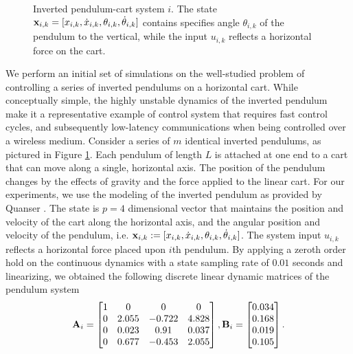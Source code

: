 \begin{figure}

\caption{Inverted pendulum-cart system $i$. The state ${\mathbf x}_{i,k} = [x_{i,k}, \dot{x}_{i,k}, \theta_{i,k}, \dot{\theta}_{i,k}]$ contains specifies angle $ \theta_{i,k}$ of the pendulum to the vertical, while the input $u_{i,k}$ reflects a horizontal force on the cart.}
\label{fig_inverted_pendulum}
\end{figure}


We perform an initial set of simulations on the well-studied problem of controlling a series of inverted pendulums on a horizontal cart. While conceptually simple, the highly unstable dynamics of the inverted pendulum make it a representative example of control system that requires fast control cycles, and subsequently low-latency communications when being controlled over a wireless medium. Consider a series of $m$ identical inverted pendulums, as pictured in Figure \ref{fig_inverted_pendulum}. Each pendulum of length $L$ is attached at one end to a cart that can move along a single, horizontal axis. The position of the pendulum changes by the effects of gravity and the force applied to the linear cart. For our experiments, we use the modeling of the inverted pendulum as provided by Quanser \cite{quanser}. The state is $p=4$ dimensional vector that maintains the position and velocity of the cart along the horizontal axis, and the angular position and velocity of the pendulum, i.e. ${\mathbf x}_{i,k} := [x_{i,k}, \dot{x}_{i,k}, \theta_{i,k}, \dot{\theta}_{i,k}]$. The system input $u_{i,k}$ reflects a horizontal force placed upon $i$th pendulum. By applying a zeroth order hold on the continuous dynamics with a state sampling rate of $0.01$ seconds and linearizing, we obtained the following discrete linear dynamic matrices of the pendulum system
%
\begin{align}\label{eq_control_orig}
\bbA_i =
\begin{bmatrix}
1 & 0 & 0 & 0 \\
0 & 2.055 & -0.722 & 4.828 \\
0 & 0.023 & 0.91 & 0.037 \\
0 & 0.677 & -0.453 & 2.055
\end{bmatrix},
\bbB_i =
\begin{bmatrix}
0.034 \\ 0.168 \\ 0.019 \\ 0.105
\end{bmatrix}.
\end{align}
%

